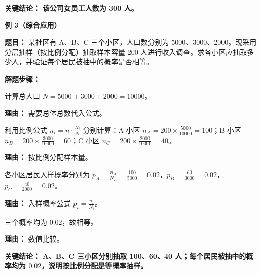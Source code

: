 \begin{examplebox}
	\textbf{\textcolor{CExample}{关键结论：}}
	\textbf{该公司女员工人数为 300 人。}

	\medskip
	\textbf{\textcolor{CExample}{例 3（综合应用）}}

	\textbf{\textcolor{CExample}{题目：}}
	某社区有 A、B、C 三个小区，人口数分别为 5000、3000、2000。现采用分层抽样（按比例分配）抽取样本容量 200 人进行收入调查。求各小区应抽取多少人，并验证每个居民被抽中的概率是否相等。

	\textbf{\textcolor{CExample}{解题步骤：}}
	\begin{description}[style=nextline, leftmargin=2.8em, labelsep=0.5em, itemsep=0.45em]
		\item[\textbf{第一步（总人口）：}] 计算总人口 $N = 5000 + 3000 + 2000 = 10000$。
			\par\textbf{理由：} 需要总体总数代入公式。
		\item[\textbf{第二步（求各层样本量）：}] 利用比例公式 $n_i = n \cdot \frac{N_i}{N}$ 分别计算：A 小区 $n_A = 200 \times \frac{5000}{10000} = 100$；B 小区 $n_B = 200 \times \frac{3000}{10000} = 60$；C 小区 $n_C = 200 \times \frac{2000}{10000} = 40$。
			\par\textbf{理由：} 按比例分配样本量。
		\item[\textbf{第三步（计算入样概率）：}] 各小区居民入样概率分别为 $p_A = \frac{n_A}{N_A} = \frac{100}{5000} = 0.02$，$p_B = \frac{60}{3000} = 0.02$，$p_C = \frac{40}{2000} = 0.02$。
			\par\textbf{理由：} 入样概率公式 $p_i = \frac{n_i}{N_i}$。
		\item[\textbf{第四步（判断相等）：}] 三个概率均为 $0.02$，故相等。
			\par\textbf{理由：} 数值比较。
	\end{description}

	\textbf{\textcolor{CExample}{关键结论：}}
	\textbf{A、B、C 三小区分别抽取 100、60、40 人；每个居民被抽中的概率均为 $0.02$，说明按比例分配是等概率抽样。}
\end{examplebox}
